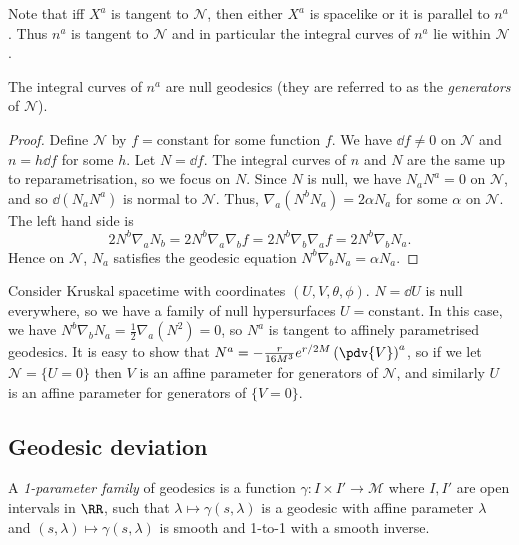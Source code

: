 \documentclass{jknotes}
\begin{document}
Note that iff \(X^a\) is tangent to \(\mathcal{N}\), then either \(X^a\) is spacelike or it is parallel to \(n^a\). Thus \(n^a\) is tangent to \(\mathcal{N}\) and in particular the integral curves of \(n^a\) lie within \(\mathcal{N}\).

\begin{lemma}
    The integral curves of \(n^a\) are null geodesics (they are referred to as the \emph{generators} of \(\mathcal{N}\)).
\end{lemma}
\begin{proof}
    Define \(\mathcal{N}\) by \(f = \text{constant}\) for some function \(f\). We have \(\dd{f}\ne 0\) on \(\mathcal{N}\) and \(n=h\dd{f}\) for some \(h\). Let \(N=\dd{f}\). The integral curves of \(n\) and \(N\) are the same up to reparametrisation, so we focus on \(N\). Since \(N\) is null, we have \(N_aN^a=0\) on \(\mathcal{N}\), and so \(\dd{(N_aN^a)}\) is normal to \(\mathcal{N}\). Thus, \(\nabla_a(N^bN_a) = 2\alpha N_a\) for some \(\alpha\) on \(\mathcal{N}\). The left hand side is
    \begin{equation}
        2N^b\nabla_a N_b = 2N^b \nabla_a\nabla_b f = 2N^b\nabla_b\nabla_a f = 2N^b\nabla_bN_a.
    \end{equation}
    Hence on \(\mathcal{N}\), \(N_a\) satisfies the geodesic equation \(N^b\nabla_b N_a = \alpha N_a\).
\end{proof}

\begin{eg}
    Consider Kruskal spacetime with coordinates \((U,V,\theta,\phi)\). \(N=\dd{U}\) is null everywhere, so we have a family of null hypersurfaces \(U = \text{constant}\). In this case, we have \(N^b\nabla_b N_a = \frac{1}{2}\nabla_a(N^2) = 0\), so \(N^a\) is tangent to affinely parametrised geodesics. It is easy to show that \(N^a = - \frac{r}{16M^3}e^{r/2M} \left(\pdv{V}\right)^a\), so if we let \(\mathcal{N}=\{U=0\}\) then \(V\) is an affine parameter for generators of \(\mathcal{N}\), and similarly \(U\) is an affine parameter for generators of \(\{V=0\}\).
\end{eg}

\subsection{Geodesic deviation}
\begin{defn}
    A \emph{1-parameter family} of geodesics is a function \(\gamma:I\times I'\to\mathcal{M}\) where \(I,I'\) are open intervals in \(\RR\), such that \(\lambda\mapsto\gamma(s,\lambda)\) is a geodesic with affine parameter \(\lambda\) and \((s,\lambda)\mapsto\gamma(s,\lambda)\) is smooth and 1-to-1 with a smooth inverse.
\end{defn}
\end{document}
